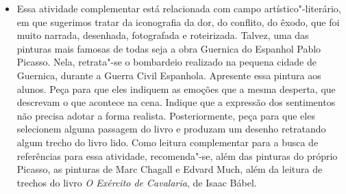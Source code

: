\documentclass[12pt]{extarticle}
\begin{document}
\begin{itemize}
\begin{comment}
A escrita literária, por sua vez, ainda que não seja o foco central do
componente de Língua Portuguesa, também se mostra rica em possibilidades
expressivas. (\textsc{bncc}, p. 495-496).
\end{quote}
\end{comment}
\item Essa atividade complementar está relacionada com campo artístico"-literário,
em que sugerimos tratar da
iconografia da dor, do conflito, do êxodo, que foi muito narrada,
desenhada, fotografada e roteirizada. Talvez, uma das pinturas mais
famosas de todas seja a obra Guernica do Espanhol Pablo Picasso. Nela,
retrata"-se o bombardeio realizado na pequena cidade de Guernica,
durante a Guerra Civil Espanhola. Apresente essa pintura aos alunos.
Peça para que eles indiquem as emoções que a mesma desperta, que
descrevam o que acontece na cena. Indique que a expressão dos
sentimentos não precisa adotar a forma realista. Posteriormente, peça
para que eles selecionem alguma passagem do livro e produzam um
desenho retratando algum trecho do livro lido. Como leitura
complementar para a busca de referências para essa atividade,
recomenda"-se, além das pinturas do próprio Picasso, as pinturas de Marc
Chagall e Edvard Much, além da leitura de trechos do livro \emph{O
Exército de Cavalaria}, de Isaac Bábel.

\begin{comment}
\subsection{Campo das práticas de estudo e pesquisa}

\begin{quote}
O campo das práticas de estudo e pesquisa mantém destaque para os
gêneros e habilidades envolvidos na leitura/escuta e produção de textos
de diferentes áreas do conhecimento e para as habilidades e
procedimentos envolvidos no estudo. Ganham realce também as habilidades
relacionadas à análise, síntese, reflexão, problematização e pesquisa:
estabelecimento de recorte da questão ou problema; seleção de
informações; estabelecimento das condições de coleta de dados para a
realização de levantamentos; realização de pesquisas de diferentes
tipos; tratamento dos dados e informações; e formas de uso e
socialização dos resultados e análises.

Além de fazer uso competente da língua e das outras semioses, os
estudantes devem ter uma atitude investigativa e criativa em relação a
elas e compreender princípios e procedimentos metodológicos que orientam
a produção do conhecimento sobre a língua e as linguagens e a formulação
de regras. (\textsc{bncc}, p. 495-496)
\end{quote}
\end{comment}


\end{itemize}
\end{document}
